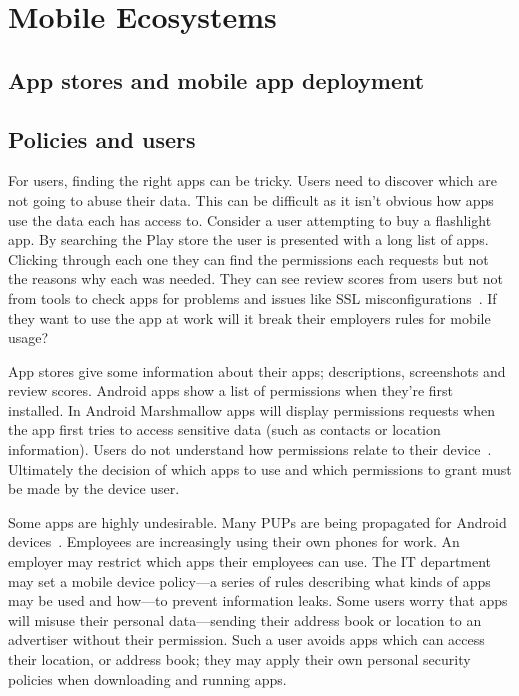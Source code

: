 \documentclass[thesis.tex]{subfiles}
\begin{document}
\chapter{Mobile Ecosystems}

\section{App stores and mobile app deployment}

\section{Policies and users}

For users, finding the right apps can be tricky.
Users need to discover which are not going to abuse their data.
This can be difficult as it isn't obvious how apps use the data each has access to.
Consider a user attempting to buy a flashlight app.
By searching the Play store the user is presented with a long list of apps.
Clicking through each one they can find the permissions each requests but not the reasons why each was needed.
They can see review scores from users but not from tools to check apps for problems and issues like SSL misconfigurations~\cite{fahl_why_2012}.
If they want to use the app at work will it break their employers rules for mobile usage?

App stores give some information about their apps; descriptions, screenshots and review scores.
Android apps show a list of permissions when they're first installed.
In Android Marshmallow apps will display permissions requests when the app first tries to access sensitive data (such as contacts or location information).
Users do not understand how permissions relate to their device~\cite{felt_android_2012,thompson_when_2013}.
Ultimately the decision of which apps to use and which permissions to grant must be made by the device user.

Some apps are highly undesirable.
Many \acp{PUP} are being propagated for Android devices~\cite{truong_company_2014,vanja_svajcer_classifying_????}.
Employees are increasingly using their own phones for work.
An employer may restrict which apps their employees can use.
The IT department may set a mobile device policy---a series of rules describing what kinds of apps may be used and how---to prevent information leaks.
Some users worry that apps will misuse their personal data---sending their address book or location to an advertiser without their permission.
Such a user avoids apps which can access their location, or address book; they may apply their own personal security policies when downloading and running apps.
\end{document}
